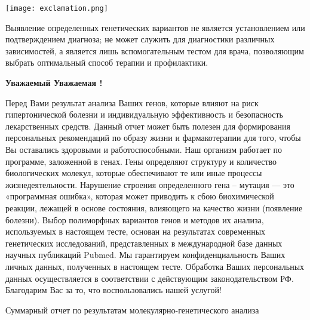 \documentclass[russian,a4paper,12pt]{article}
\begin{document}
\vspace{-10mm}
\noindent
\parbox[b][3cm][t]{10mm}{
	\texttt{[image: exclamation.png]}}
\hfill
\parbox[b][3cm][t]{100mm}{
	Выявление определенных генетических вариантов не является установлением или подтверждением диагноза; не может служить для диагностики различных зависимостей, а является лишь вспомогательным тестом для врача, позволяющим выбрать оптимальный способ терапии и профилактики.}

\vspace{15mm}
\begin{center}
	\textbf{
		Уважаемый
		Уважаемая 
		!}
\end{center}

Перед Вами результат анализа Ваших генов, которые влияют на риск гипертонической болезни и индивидуальную эффективность и безопасность лекарственных средств. Данный отчет может быть полезен для формирования персональных рекомендаций по образу жизни и фармакотерапии для того, чтобы Вы оставались здоровыми и работоспособными.
Наш организм работает по программе, заложенной в генах. Гены определяют структуру и количество биологических молекул, которые обеспечивают те или иные процессы жизнедеятельности. Нарушение строения определенного гена – мутация — это «программная ошибка», которая может приводить к сбою биохимической реакции, лежащей в основе состояния, влияющего на качество жизни (появление болезни). 
Выбор полиморфных вариантов генов и методов их анализа, используемых в настоящем тесте, основан на результатах современных генетических исследований, представленных в международной базе данных научных публикаций Pubmed. 
Мы гарантируем конфиденциальность Ваших личных данных, полученных в настоящем тесте. Обработка Ваших персональных данных осуществляется в соответствии с действующим законодательством РФ.
Благодарим Вас за то, что воспользовались нашей услугой!

\pagebreak
\begin{center}
	\large{Суммарный отчет по результатам молекулярно-генетического анализа}
\end{center}
\end{document}
